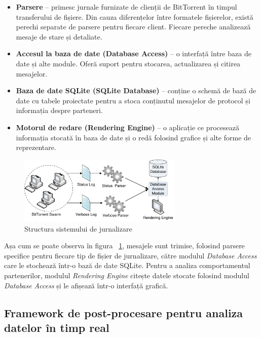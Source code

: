\begin{itemize}
  \item \textbf{Parsere} -- primesc jurnale furnizate de clienții de BitTorrent
  în timpul transferului de fișiere. Din cauza diferențelor între formatele
  fișierelor, există perechi separate de parsere pentru fiecare client.
  Fiecare pereche analizează mesaje de stare și detaliate.
  \item \textbf{Accesul la baza de date (Database Access)} -- o interfață între baza de date
  și alte module. Oferă suport pentru stocarea, actualizarea și citirea
  mesajelor.
  \item \textbf{Baza de date SQLite (SQLite Database)} -- conține o schemă de bază de date cu
  tabele proiectate pentru a stoca conținutul mesajelor de protocol și
  informația despre parteneri.
  \item \textbf{Motorul de redare (Rendering Engine)} -- o aplicație ce procesează informația
  stocată în baza de date și o redă folosind grafice și alte forme de
  reprezentare.
\end{itemize}

\begin{figure}[h]
  \begin{center}
    \includegraphics[width=0.7\textwidth]{src/img/proto-measure/logarch-not-use}
  \end{center}
  \caption{Structura sistemului de jurnalizare}
  \label{fig:proto-measure:logarch}
\end{figure}

Așa cum se poate observa în figura ~\ref{fig:proto-measure:logarch},
mesajele sunt trimise, folosind parsere specifice pentru fiecare tip de fișier
de jurnalizare, către modulul \textit{Database Access} care le stochează
într-o bază de date SQLite. Pentru a analiza comportamentul partenerilor,
modulul \textit{Rendering Engine} citește datele stocate folosind modulul
\textit{Database Access} și le afișează într-o interfață grafică.

\subsection{Framework de post-procesare pentru analiza datelor în timp real}

